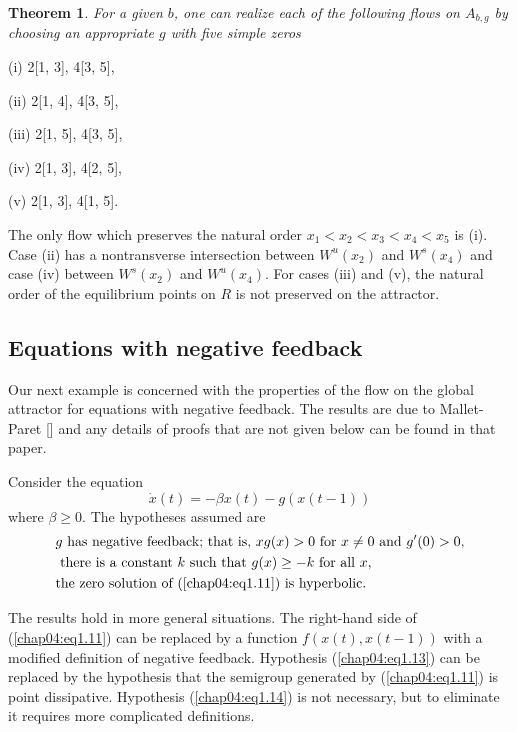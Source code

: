 \documentclass{surv-l}
\theoremstyle{plain}
\newtheorem{theorem}{Theorem}[section]
\theoremstyle{definition}
\numberwithin{equation}{section}
\numberwithin{figure}{chapter}
\begin{document}
\begin{theorem}\label{thm4.1.7}
For a given $b$, one can realize each of the following flows on $A_{b,g}$ by choosing an appropriate $g$ with five simple zeros
\end{theorem}

(i) 2[1, 3], 4[3, 5],

(ii) 2[1, 4], 4[3, 5],

(iii) 2[1, 5], 4[3, 5],

(iv) 2[1, 3], 4[2, 5],

(v) 2[1, 3], 4[1, 5].


The only flow which preserves the natural order $x_{1}<x_{2}<x_{3}<x_{4}<x_{5}$ is (i). Case (ii) has a nontransverse intersection between $W^{u}(x_{2})$ and $W^{s}(x_{4})$ and case (iv) between $W^{s}(x_{2})$ and $W^{u}(x_{4})$. For cases (iii) and (v), the natural order of the equilibrium points on $R$ is not preserved on the attractor.

\subsection{Equations with negative feedback}\label{subsec4.1.5} Our next example is concerned with the properties of the flow on the global attractor for equations with negative feedback. The results are due to Mallet-Paret [\citeyear{1988m}] and any details of proofs that are not given below can be found in that paper.

Consider the equation
\begin{equation}\label{chap04:eq1.11}
\dot{x}(t)=-\beta x(t)-g(x(t-1))
\end{equation}
where $\beta\geq 0$. The hypotheses assumed are
\begin{align}
&g\text{ has negative feedback; that is, }xg(x)>0 \text{ for } x\neq 0 \text{ and }  g^{\prime}(0)>0,\label{chap04:eq1.12}\\
&\text{ there is a constant } k\text{ such that } g(x)\geq-k \text{ for all } x,\label{chap04:eq1.13}\\
&\text{the zero solution of (\ref{chap04:eq1.11}) is hyperbolic}.\label{chap04:eq1.14}
\end{align}

The results hold in more general situations. The right-hand side of (\ref{chap04:eq1.11}) can be replaced by a function $f(x(t), x(t-1))$ with a modified definition of negative feedback. Hypothesis (\ref{chap04:eq1.13}) can be replaced by the hypothesis that the semigroup generated by (\ref{chap04:eq1.11}) is point dissipative. Hypothesis (\ref{chap04:eq1.14}) is not necessary, but to eliminate it requires more complicated definitions.
\end{document}
